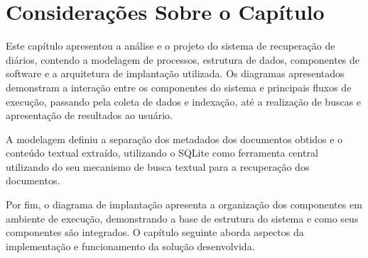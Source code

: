 
\section{Considerações Sobre o Capítulo}
Este capítulo apresentou a análise e o projeto do sistema de recuperação de diários, contendo a modelagem de processos, estrutura de dados, componentes de software e a arquitetura de implantação utilizada. Os diagramas apresentados demonstram a interação entre os componentes do sistema e principais fluxos de execução, passando pela coleta de dados e indexação, até a realização de buscas e apresentação de resultados ao usuário.

A modelagem definiu a separação dos metadados dos documentos obtidos e o conteúdo textual extraído, utilizando o SQLite como ferramenta central utilizando do seu mecanismo de busca textual para a recuperação dos documentos.

Por fim, o diagrama de implantação apresenta a organização dos componentes em ambiente de execução, demonstrando a base de estrutura do sistema e como seus componentes são integrados. O capítulo seguinte aborda aspectos da implementação e funcionamento da solução desenvolvida.

